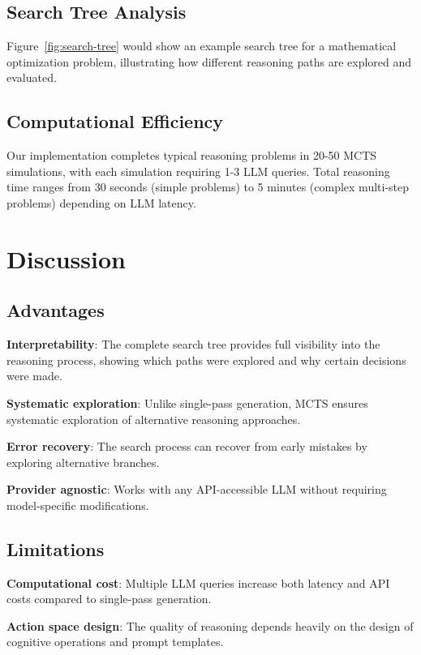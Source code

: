 \documentclass[conference]{IEEEtran}
\begin{document}
\subsection{Search Tree Analysis}

Figure~\ref{fig:search-tree} would show an example search tree for a mathematical optimization problem, illustrating how different reasoning paths are explored and evaluated.

\subsection{Computational Efficiency}

Our implementation completes typical reasoning problems in 20-50 MCTS simulations, with each simulation requiring 1-3 LLM queries. Total reasoning time ranges from 30 seconds (simple problems) to 5 minutes (complex multi-step problems) depending on LLM latency.

\section{Discussion}

\subsection{Advantages}

\textbf{Interpretability}: The complete search tree provides full visibility into the reasoning process, showing which paths were explored and why certain decisions were made.

\textbf{Systematic exploration}: Unlike single-pass generation, MCTS ensures systematic exploration of alternative reasoning approaches.

\textbf{Error recovery}: The search process can recover from early mistakes by exploring alternative branches.

\textbf{Provider agnostic}: Works with any API-accessible LLM without requiring model-specific modifications.

\subsection{Limitations}

\textbf{Computational cost}: Multiple LLM queries increase both latency and API costs compared to single-pass generation.

\textbf{Action space design}: The quality of reasoning depends heavily on the design of cognitive operations and prompt templates.
\end{document}
